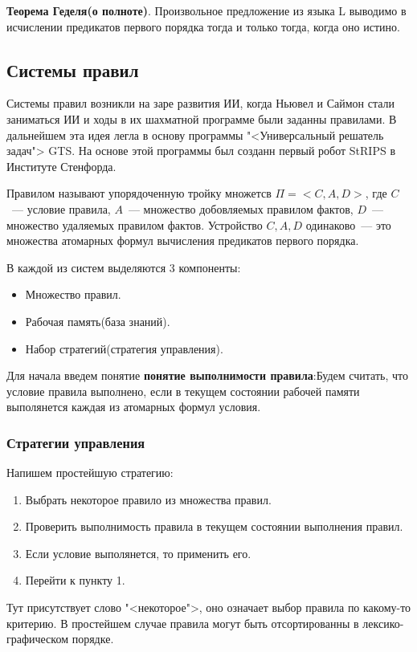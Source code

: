 \textbf{Теорема Геделя(о полноте)}. Произвольное предложение из языка L выводимо в исчислении предикатов первого порядка тогда и только тогда, когда оно истино.

\subsection{Системы правил}
Системы правил возникли на заре развития ИИ, когда Ньювел и Саймон стали заниматься ИИ и ходы в их шахматной программе были заданны правилами. В дальнейшем эта идея легла в основу программы "<Универсальный решатель задач"> GTS. На основе этой программы был созданн первый робот StRIPS в Институте Стенфорда.

Правилом называют упорядоченную тройку множетсв $\Pi=<C,A,D>$, где $C$~--- условие правила, $A$~--- множество добовляемых правилом фактов, $D$~--- множество удаляемых правилом фактов. Устройство $C,A,D$ одинаково~--- это множества атомарных формул вычисления предикатов первого порядка.

В каждой из систем выделяются 3 компоненты:
\begin{itemize}
	\item Множество правил.
	\item Рабочая память(база знаний).
	\item Набор стратегий(стратегия управления).
\end{itemize}

Для начала введем понятие \textbf{понятие выполнимости правила}:Будем считать, что условие правила выполнено, если в текущем состоянии рабочей памяти выполянется каждая из атомарных формул условия.

\subsubsection{Стратегии управления}
Напишем простейшую стратегию:
\begin{enumerate}
	\item Выбрать некоторое правило из множества правил.
	\item Проверить выполнимость правила в текущем состоянии выполнения правил.
	\item Если условие выполянется, то применить его.
	\item Перейти к пункту 1.
\end{enumerate}
Тут присутствует слово "<некоторое">, оно означает выбор правила по какому-то критерию. В простейшем случае правила могут быть отсортированны в лексико-графическом порядке.

